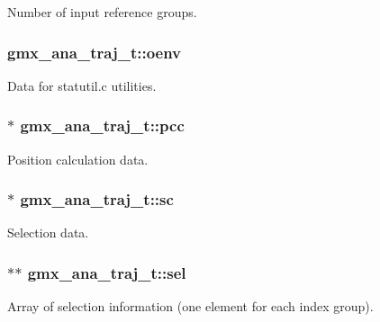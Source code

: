 \-Number of input reference groups. \hypertarget{structgmx__ana__traj__t_a5c3b4850dc60d9456702a883114cc833}{
\subsubsection[{oenv}]{ {\bf gmx\-\_\-ana\-\_\-traj\-\_\-t\-::oenv}}}\label{structgmx__ana__traj__t_a5c3b4850dc60d9456702a883114cc833}
\-Data for statutil.\-c utilities. \hypertarget{structgmx__ana__traj__t_acfe937ff43b97461fbc6969dfedcb77b}{
\subsubsection[{pcc}]{$\ast$ {\bf gmx\-\_\-ana\-\_\-traj\-\_\-t\-::pcc}}}\label{structgmx__ana__traj__t_acfe937ff43b97461fbc6969dfedcb77b}
\-Position calculation data. \hypertarget{structgmx__ana__traj__t_a4cf48d41e284b592d6949f7b10f68fad}{
\subsubsection[{sc}]{$\ast$ {\bf gmx\-\_\-ana\-\_\-traj\-\_\-t\-::sc}}}\label{structgmx__ana__traj__t_a4cf48d41e284b592d6949f7b10f68fad}
\-Selection data. \hypertarget{structgmx__ana__traj__t_a6e4035cd8282c5d0610b327be92b12d3}{
\subsubsection[{sel}]{$\ast$$\ast$ {\bf gmx\-\_\-ana\-\_\-traj\-\_\-t\-::sel}}}\label{structgmx__ana__traj__t_a6e4035cd8282c5d0610b327be92b12d3}


\-Array of selection information (one element for each index group). 

